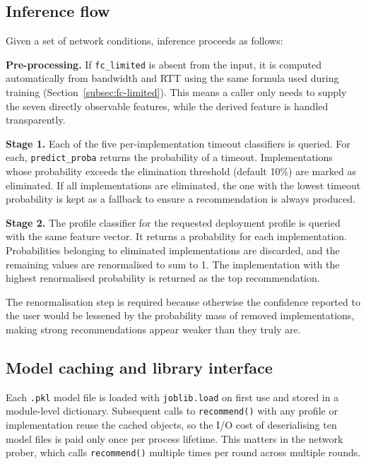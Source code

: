 \subsection{Inference flow}
\label{subsec:inference-flow}

Given a set of network conditions, inference proceeds as follows:

\textbf{Pre-processing.} If \texttt{fc\_limited} is absent from the input,
it is computed automatically from bandwidth and RTT using the same formula
used during training (Section~\ref{subsec:fc-limited}). This means a caller
only needs to supply the seven directly observable features, while the derived
feature is handled transparently.

\textbf{Stage 1.} Each of the five per-implementation timeout classifiers
is queried. For each, \texttt{predict\_proba} returns the probability of
a timeout. Implementations whose probability exceeds the elimination
threshold (default 10\%) are marked as eliminated. If all implementations
are eliminated, the one with the lowest timeout probability is kept as a
fallback to ensure a recommendation is always produced.

\textbf{Stage 2.} The profile classifier for the requested deployment profile
is queried with the same feature vector. It returns a probability for each
implementation. Probabilities belonging to eliminated implementations are
discarded, and the remaining values are renormalised to sum to 1. The
implementation with the highest renormalised probability is returned as
the top recommendation.

The renormalisation step is required because otherwise the confidence reported
to the user would be lessened by the probability mass of removed implementations,
making strong recommendations appear weaker than they truly are.

\subsection{Model caching and library interface}
\label{subsec:model-caching}

Each \texttt{.pkl} model file is loaded with \texttt{joblib.load} on first
use and stored in a module-level dictionary. Subsequent calls to
\texttt{recommend()} with any profile or implementation reuse the cached
objects, so the I/O cost of deserialising ten model files is paid only once
per process lifetime. This matters in the network prober, which calls
\texttt{recommend()} multiple times per round across multiple rounds.

